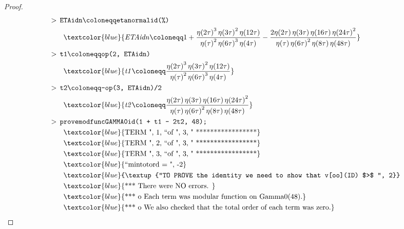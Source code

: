 \documentclass[12pt]{article}
\numberwithin{equation}{section}
\theoremstyle{plain}
\numberwithin{theorem}{section}
\theoremstyle{definition}
\theoremstyle{remark}
\begin{document}
\begin{proof}
\begin{align*}
     &>\, \texttt{ETAidn}\coloneqq \texttt{etanormalid(\%)}\\
    &\quad\quad \textcolor{blue}{\mathit{ETAidn}\coloneqq 1+\frac{\eta \! \left(2 \tau \right)^{3} \eta \! \left(3 \tau \right)^{2} \eta \! \left(12 \tau \right)}{\eta \! \left(\tau \right)^{2} \eta \! \left(6 \tau \right)^{3} \eta \! \left(4 \tau \right)}-\frac{2 \eta \! \left(2 \tau \right) \eta \! \left(3 \tau \right) \eta \! \left(16 \tau \right) \eta \! \left(24 \tau \right)^{2}}{\eta \! \left(\tau \right) \eta \! \left(6 \tau \right)^{2} \eta \! \left(8 \tau \right) \eta \! \left(48 \tau \right)}}\\
    &>\, \texttt{t1}\coloneqq \texttt{op(2, ETAidn)}\\
    &\quad\quad \textcolor{blue}{\mathit{t1}\coloneqq \frac{\eta \! \left(2 \tau \right)^{3} \eta \! \left(3 \tau \right)^{2} \eta \! \left(12 \tau \right)}{\eta \! \left(\tau \right)^{2} \eta \! \left(6 \tau \right)^{3} \eta \! \left(4 \tau \right)}}\\
     &>\, \texttt{t2}\coloneqq \texttt{-op(3, ETAidn)/2}\\
    &\quad\quad \textcolor{blue}{\mathit{t2}\coloneqq \frac{\eta \! \left(2 \tau \right) \eta \! \left(3 \tau \right) \eta \! \left(16 \tau \right) \eta \! \left(24 \tau \right)^{2}}{\eta \! \left(\tau \right) \eta \! \left(6 \tau \right)^{2} \eta \! \left(8 \tau \right) \eta \! \left(48 \tau \right)}}\\
    &>\, \texttt{provemodfuncGAMMA0id(1 + t1 - 2t2, 48);}\\
    &\quad \quad \textcolor{blue}{\textup{TERM ", 1, ``of ", 3, " *****************}}\\
    &\quad \quad \textcolor{blue}{\textup{TERM ", 2, ``of ", 3, " *****************}}\\
    &\quad \quad \textcolor{blue}{\textup{TERM ", 3, ``of ", 3, " *****************}}\\
    &\quad \quad \textcolor{blue}{\textup{``mintotord = ", -2}}\\
    &\quad \quad \textcolor{blue}{\textup{``TO PROVE the identity we need to show that v[oo](ID) $>$ ", 2}}\\
    &\quad \quad \textcolor{blue}{\textup{*** There were NO errors. }}\\
    &\quad \quad \textcolor{blue}{\textup{*** o Each term was modular function on Gamma0(48).}}\\
    &\quad \quad \textcolor{blue}{\textup{*** o We also checked that the total order of each term was zero.}}\\

\end{align*}
\end{proof}
\end{document}
